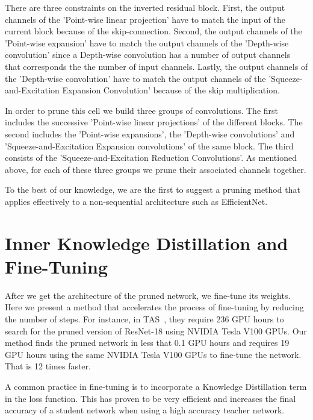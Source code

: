 \documentclass{article}
\begin{document}
There are three constraints on the inverted residual block.
First, the output channels of the 'Point-wise linear projection' have to match the input of the current block because of the skip-connection. Second, the output channels of the 'Point-wise expansion' have to match the output channels of the 'Depth-wise convolution' since a Depth-wise convolution has a number of output channels that corresponds the the number of input channels. Lastly, the output channels of the 'Depth-wise convolution' have to match the output channels of the 'Squeeze-and-Excitation Expansion Convolution' because of the skip multiplication.

In order to prune this cell we build three groups of convolutions. 
The first includes the successive 'Point-wise linear projections' of the different blocks. The second includes the 'Point-wise expansions', the 'Depth-wise convolutions' and 'Squeeze-and-Excitation Expansion convolutions' of the same block. 
The third consists of the 'Squeeze-and-Excitation Reduction Convolutions'.
As mentioned above, for each of these three groups we prune their associated channels together.

To the best of our knowledge, we are the first to suggest a pruning method that applies effectively to a non-sequential architecture such as EfficientNet.


\vspace{-5pt} 
\section{Inner Knowledge Distillation and Fine-Tuning}
\label{sec:IKD}
\vspace{-5pt} 
After we get the architecture of the pruned network, we fine-tune its weights. Here we present a method that accelerates the process of fine-tuning by reducing the number of steps. For instance, in TAS~\cite{TAS}, they require 236 GPU hours to search for the pruned version of ResNet-18 using NVIDIA Tesla V100 GPUs. Our method finds the pruned network in less that 0.1 GPU hours and requires 19 GPU hours using the same NVIDIA Tesla V100 GPUs to fine-tune the network. That is 12 times faster.

A common practice in fine-tuning is to incorporate a Knowledge Distillation term \cite{KnowledgeDistillation, tian2020contrastiveRepDistillation} in the loss function. 
This has proven to be very efficient and increases the final accuracy of a student network when using a high accuracy teacher network.
\end{document}
